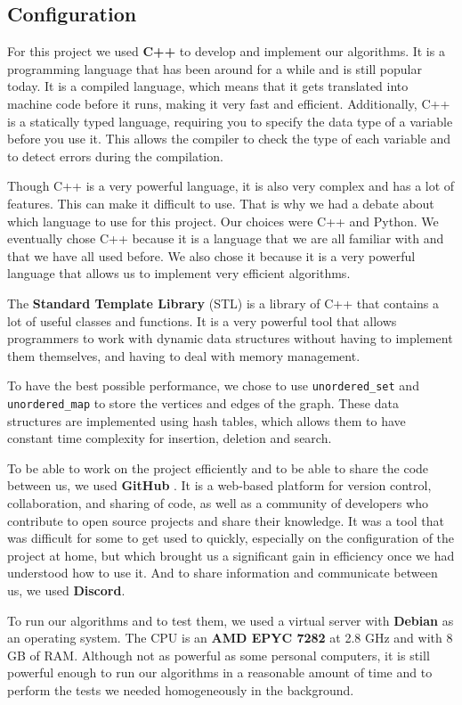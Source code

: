 \subsection{Configuration}

For this project we used \textbf{C++} to develop and implement our algorithms. 
It is a programming language that has been around for a while and is still popular today. 
It is a compiled language, which means that it gets translated into machine code before it runs, making it very fast and efficient. 
Additionally, C++ is a statically typed language, requiring you to specify the data type of a variable before you use it. 
This allows the compiler 
to check the type of each variable and to detect errors during the compilation. \bigskip

Though C++ is a very powerful language, it is also very complex and has a lot of
features. This can make it difficult to use. That is why we had a debate about
which language to use for this project. Our choices were C++ and Python. We
eventually chose C++ because it is a language that we are all familiar with and
that we have all used before. We also chose it because it is a very powerful
language that allows us to implement very efficient algorithms.\bigskip

The \textbf{Standard Template Library} (STL) is a library of C++ that contains 
a lot of useful classes and functions. It is a very powerful tool that allows 
programmers to work with dynamic data structures without having to implement 
them themselves, and having to deal with memory management. \bigskip

To have the best possible performance, we chose to use \texttt{unordered\_set}
and \texttt{unordered\_map} to store the vertices and edges of the graph. These
data structures are implemented using hash tables, which allows them to have
constant time complexity for insertion, deletion and search. \bigskip

To be able to work on the project efficiently and to be able to share the code
between us, we used \textbf{GitHub}\footnotemark 
{}.
It is a web-based platform for version control, collaboration, and sharing of
code, as well as a community of developers who contribute to open source projects
and share their knowledge. It was a tool that was difficult for some to get used
to quickly, especially on the configuration of the project at home, but which
brought us a significant gain in efficiency once we had understood how to use it.
And to share information and communicate between us, we used \textbf{Discord}.
\bigskip

To run our algorithms and to test them, we used a virtual server with \textbf{Debian}
as an operating system. The CPU is an \textbf{AMD EPYC 7282} at 2.8 GHz and with
8 GB of RAM. Although not as powerful as some personal computers, it is still
powerful enough to run our algorithms in a reasonable amount of time and to
perform the tests we needed homogeneously in the background.